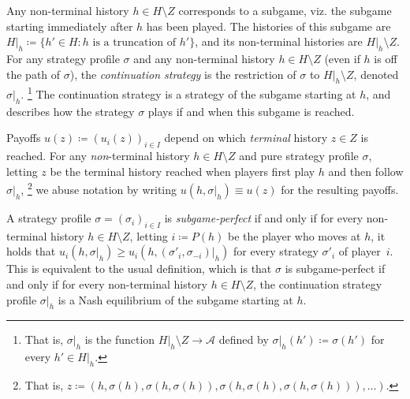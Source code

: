 Any non-terminal history $h \in H \setminus Z$ corresponds to a subgame, viz. the subgame starting immediately after $h$ has been played. The histories of this subgame are $H|_h \coloneqq \{ h' \in H : \text{$h$ is a truncation of $h'$} \}$, and its non-terminal histories are $H|_h \setminus Z$. For any strategy profile $\sigma$ and any non-terminal history $h \in H \setminus Z$ (even if $h$ is off the path of $\sigma$), the \emph{continuation strategy} is the restriction of $\sigma$ to $H|_h \setminus Z$, denoted $\sigma|_h$.%
	\footnote{That is, $\sigma|_h$ is the function $H|_h \setminus Z \to \mathcal{A}$ defined by $\sigma|_h(h') \coloneqq \sigma(h')$ for every $h' \in H|_h$.}
The continuation strategy is a strategy of the subgame starting at $h$, and describes how the strategy $\sigma$ plays if and when this subgame is reached.

Payoffs $u(z) \coloneqq (u_i(z))_{i \in I}$ depend on which \emph{terminal} history $z \in Z$ is reached. For any \emph{non}-terminal history $h \in H \setminus Z$ and pure strategy profile $\sigma$, letting $z$ be the terminal history reached when players first play $h$ and then follow $\sigma|_h$,%
	\footnote{That is, $z \coloneqq ( h, \sigma(h), \sigma( h, \sigma(h) ), \sigma( h, \sigma(h), \sigma( h, \sigma(h) ) ), \dots )$.}
we abuse notation by writing $u(h,\sigma|_h) \equiv u(z)$ for the resulting payoffs.

A strategy profile $\sigma = (\sigma_i)_{i \in I}$ is \emph{subgame-perfect} if and only if for every non-terminal history $h \in H \setminus Z$, letting $i \coloneqq P(h)$ be the player who moves at $h$, it holds that $u_i(h,\sigma|_h) \geq u_i(h,(\sigma'_i,\sigma_{-i})|_h)$ for every strategy $\sigma'_i$ of player~$i$. This is equivalent to the usual definition, which is that $\sigma$ is subgame-perfect if and only if for every non-terminal history $h \in H \setminus Z$, the continuation strategy profile $\sigma|_h$ is a Nash equilibrium of the subgame starting at $h$.

